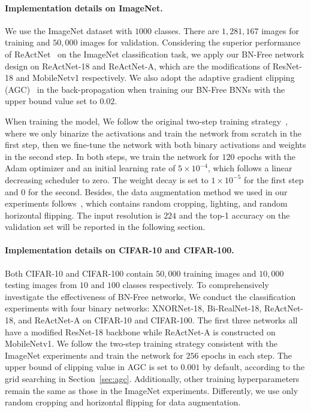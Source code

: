 \documentclass[final]{cvpr}
\begin{document}
\paragraph{Implementation details on ImageNet.} We use the ImageNet dataset with $1000$ classes. There are $1,281,167$ images for training and $50,000$ images for validation. Considering the superior performance of ReActNet~\cite{liu2019circulant} on the ImageNet classification task, we apply our BN-Free network design on ReActNet-18 and ReActNet-A, which are the modifications of ResNet-18 and MobileNetv1 respectively. We also adopt the adaptive gradient clipping (AGC)~\cite{brock2021agc} in the back-propagation when training our BN-Free BNNs with the upper bound value set to $0.02$.

When training the model, We follow the original two-step training strategy~\cite{liu2020reactnet}, where we only binarize the activations and train the network from scratch in the first step, then we fine-tune the network with both binary activations and weights in the second step. In both steps, we train the network for $120$ epochs with the Adam optimizer and an initial learning rate of $5\times10^{-4}$, which follows a linear decreasing scheduler to zero. The weight decay is set to $1\times10^{-5}$ for the first step and $0$ for the second.  Besides, the data augmentation method we used in our experiments follows~\cite{howard2017mobilenets}, which contains random cropping, lighting, and random horizontal flipping. The input resolution is $224$ and the top-1 accuracy on the validation set will be reported in the following section.

\paragraph{Implementation details on CIFAR-10 and CIFAR-100.} Both CIFAR-10 and CIFAR-100 contain $50,000$ training images and $10,000$ testing images from $10$ and $100$ classes respectively. To comprehensively investigate the effectiveness of BN-Free networks, We conduct the classification experiments with four binary networks: XNORNet-18, Bi-RealNet-18, ReActNet-18, and ReActNet-A on CIFAR-10 and CIFAR-100. The first three networks all have a modified ResNet-18 backbone while ReActNet-A is constructed on MobileNetv1. We follow the two-step training strategy consistent with the ImageNet experiments and train the network for $256$ epochs in each step. The upper bound of clipping value in AGC is set to $0.001$ by default, according to the grid searching in  Section~\ref{sec:agc}. Additionally, other training hyperparameters remain the same as those in the ImageNet experiments. Differently, we use only random cropping and horizontal flipping for data augmentation.
\end{document}
